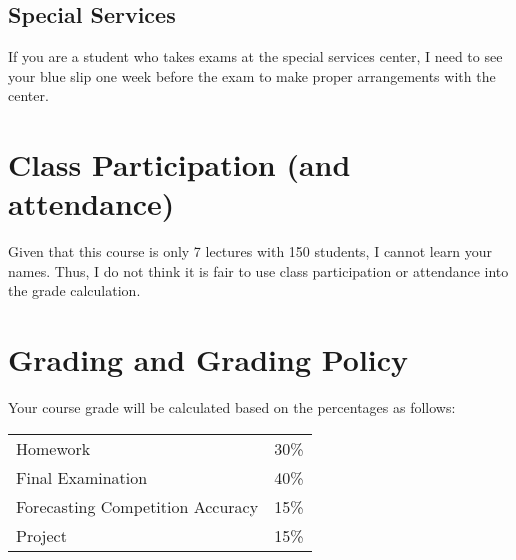 \documentclass[12pt]{article}
\newcommand{\qu}[1]{``#1''}
\begin{document}
%


%

\subsection*{Special Services}

If you are a student who takes exams at the special services center, I need to see your blue slip one week before the exam to make proper arrangements with the center.

\section*{Class Participation (and attendance)}

Given that this course is only 7 lectures with 150 students, I cannot learn your names. Thus, I do not think it is fair to use class participation or attendance into the grade calculation.


\section*{Grading and Grading Policy}\label{sec:grading}

Your course grade will be calculated based on the percentages as follows: 

\begin{table}[h]
\centering
\begin{tabular}{l|l}
Homework & 30\% \\
Final Examination & 40\% \\
Forecasting Competition Accuracy & 15\% \\
Project & 15\%
\end{tabular}
\end{table}
\FloatBarrier
\end{document}
